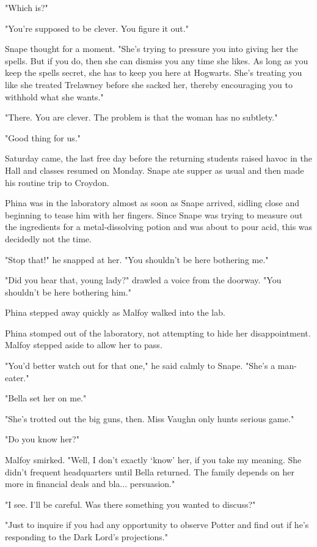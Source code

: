 "Which is?"

"You're supposed to be clever. You figure it out."

Snape thought for a moment. "She's trying to pressure you into giving her the spells. But if you do, then she can dismiss you any time she likes. As long as you keep the spells secret, she has to keep you here at Hogwarts. She's treating you like she treated Trelawney before she sacked her, thereby encouraging you to withhold what she wants."

"There. You are clever. The problem is that the woman has no subtlety."

"Good thing for us."

Saturday came, the last free day before the returning students raised havoc in the Hall and classes resumed on Monday. Snape ate supper as usual and then made his routine trip to Croydon.

Phina was in the laboratory almost as soon as Snape arrived, sidling close and beginning to tease him with her fingers. Since Snape was trying to measure out the ingredients for a metal-dissolving potion and was about to pour acid, this was decidedly not the time.

"Stop that!" he snapped at her. "You shouldn't be here bothering me."

"Did you hear that, young lady?" drawled a voice from the doorway. "You shouldn't be here bothering him."

Phina stepped away quickly as Malfoy walked into the lab.

Phina stomped out of the laboratory, not attempting to hide her disappointment. Malfoy stepped aside to allow her to pass.

"You'd better watch out for that one," he said calmly to Snape. "She's a man-eater."

"Bella set her on me."

"She's trotted out the big guns, then. Miss Vaughn only hunts serious game."

"Do you know her?"

Malfoy smirked. "Well, I don't exactly `know' her, if you take my meaning. She didn't frequent headquarters until Bella returned. The family depends on her more in financial deals and bla... persuasion."

"I see. I'll be careful. Was there something you wanted to discuss?"

"Just to inquire if you had any opportunity to observe Potter and find out if he's responding to the Dark Lord's projections."

